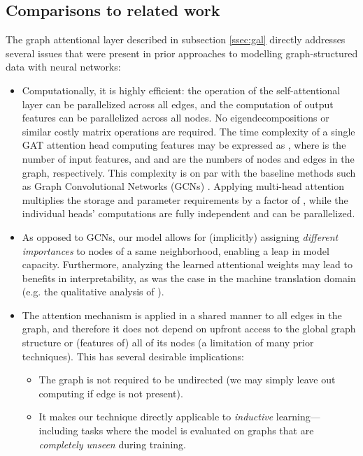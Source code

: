 \documentclass{article} \usepackage{iclr2018_conference,times}
\begin{document}
\subsection{Comparisons to related work}\label{secdisc}
The graph attentional layer described in subsection \ref{ssec:gal} directly addresses several issues that were present in prior approaches to modelling graph-structured data with neural networks:
\begin{itemize}
	\item Computationally, it is highly efficient: the operation of the self-attentional layer can be parallelized across all edges, and the computation of output features can be parallelized across all nodes. No eigendecompositions or similar costly matrix operations are required. The time complexity of a single GAT attention head computing  features may be expressed as , where  is the number of input features, and  and  are the numbers of nodes and edges in the graph, respectively. This complexity is on par with the baseline methods such as Graph Convolutional Networks (GCNs) \citep{kipf2016semi}. Applying multi-head attention multiplies the storage and parameter requirements by a factor of , while the individual heads' computations are fully independent and can be parallelized.
    \item As opposed to GCNs, our model allows for (implicitly) assigning \emph{different importances} to nodes of a same neighborhood, enabling a leap in model capacity. Furthermore, analyzing the learned attentional weights may lead to benefits in interpretability, as was the case in the machine translation domain (e.g. the qualitative analysis of \cite{bahdanau2014neural}).
    \item The attention mechanism is applied in a shared manner to all edges in the graph, and therefore it does not depend on upfront access to the global graph structure or (features of) all of its nodes (a limitation of many prior techniques). This has several desirable implications:
    \begin{itemize}
        \item The graph is not required to be undirected (we may simply leave out computing  if edge  is not present).
        \item It makes our technique directly applicable to \emph{inductive} learning---including tasks where the model is evaluated on graphs that are \emph{completely unseen} during training. 
    \end{itemize}

\end{itemize}
\end{document}
